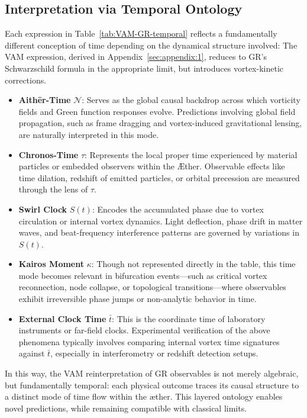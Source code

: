 \subsection*{Interpretation via Temporal Ontology}

Each expression in Table~\ref{tab:VAM-GR-temporal} reflects a fundamentally different conception of time depending on the dynamical structure involved:
The VAM expression, derived in Appendix~\ref{sec:appendix:1}, reduces to GR’s Schwarzschild formula in the appropriate limit, but introduces vortex-kinetic corrections.\\

\begin{itemize}
    \item \textbf{Aithēr-Time} \( \mathcal{N} \): Serves as the global causal backdrop across which vorticity fields and Green function responses evolve. Predictions involving global field propagation, such as frame dragging and vortex-induced gravitational lensing, are naturally interpreted in this mode.

    \item \textbf{Chronos-Time} \( \tau \): Represents the local proper time experienced by material particles or embedded observers within the Æther. Observable effects like time dilation, redshift of emitted particles, or orbital precession are measured through the lens of \( \tau \).

    \item \textbf{Swirl Clock} \( S(t) \): Encodes the accumulated phase due to vortex circulation or internal vortex dynamics. Light deflection, phase drift in matter waves, and beat-frequency interference patterns are governed by variations in \( S(t) \).

    \item \textbf{Kairos Moment} \( \kappa \): Though not represented directly in the table, this time mode becomes relevant in bifurcation events—such as critical vortex reconnection, node collapse, or topological transitions—where observables exhibit irreversible phase jumps or non-analytic behavior in time.

    \item \textbf{External Clock Time} \( \bar{t} \): This is the coordinate time of laboratory instruments or far-field clocks. Experimental verification of the above phenomena typically involves comparing internal vortex time signatures against \( \bar{t} \), especially in interferometry or redshift detection setups.
\end{itemize}

\noindent
In this way, the VAM reinterpretation of GR observables is not merely algebraic, but fundamentally temporal: each physical outcome traces its causal structure to a distinct mode of time flow within the \ae ther. This layered ontology enables novel predictions, while remaining compatible with classical limits.